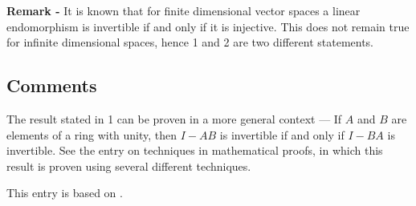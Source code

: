 \documentclass[12pt]{article}
\begin{document}
{\bf Remark -} It is known that for finite dimensional vector spaces a linear endomorphism is invertible if and only if it is injective. This does not remain true for infinite dimensional spaces, hence 1 and 2 are two different statements.

\subsection{Comments}
The result stated in 1 can be proven in a more general context --- If $A$ and $B$ are elements of a ring with unity, then $I-AB$ is invertible if and only if $I-BA$ is invertible. See the entry on techniques in mathematical proofs, in which this result is proven using several different techniques.

This entry is based on .
\end{document}

